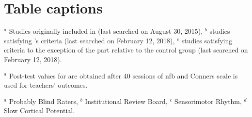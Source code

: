 \section*{Table captions}

\begin{table}[h!]
  \centering
  \caption{List of all studies included in the three different analyses.}
  
	\begin{tablenotes}
	\item $^a$ Studies originally included in \citet{Cortese2016}
	(last searched on August 30, 2015), $^b$ studies satisfying \citet{Cortese2016}'s criteria (last searched on February 12, 2018), $^c$ studies 
	satisfying \citet{Cortese2016} criteria to the exception of the part relative to the control group (last searched on February 12, 2018).
	\end{tablenotes}
  \label{Table:table_factors_analysis_meta_analysis_list_studies}
\end{table}

\begin{table}[h!]
  \centering
  \caption{Comparison between \citet{Cortese2016} results obtained with RevMan \citep{RevMan} and those obtained with the meta-analysis package with our 
	choices$^a$ applied.  (\glspl{se}) and their corresponding p-value (in parenthesis) are presented. With the meta-analysis package, a negative \gls{se}
	is in favor of  unlike \citeauthor{Cortese2016}.}
  
	\begin{tablenotes}
	\item $^a$ Post-test values for \citeauthor{Arnold2014} are obtained after 40 sessions of \gls{nfb} and Conners scale is used for \citeauthor{Steiner2014}
	teachers' outcomes.
	\end{tablenotes}
  \label{Table:meta_review_comparison_revman_and_python_with_choices}
\end{table}

\begin{table}[h!]
  \centering
  \caption{Results of the , \gls{lasso} and decision tree. For the \gls{wls}, a p-value $<$ 0.05 (in bold) means that the coefficient of 
	the corresponding factor is significantly different from 0. For the \gls{lasso}, factors not set to 0 (in bold) are selected. For the decision tree,
	the place of the factor in the tree is indicated. For the first two columns, when the value of the coefficient is negative, the corresponding factor may lead to better  results.}
  
	\begin{tablenotes}
	\begin{footnotesize}
	\item $^a$ Probably Blind Raters, $^b$ Institutional Review Board, $^c$ Sensorimotor Rhythm, $^d$ Slow Cortical Potential.
	\end{footnotesize}
	\end{tablenotes}
  \label{Table:table_factors_analysis_results_summary}
\end{table}